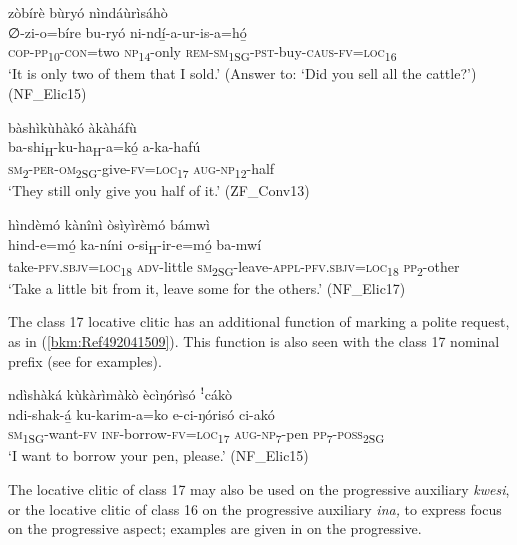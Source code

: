 \ea
\label{bkm:Ref494450771}
zòbírè bùryó nìndáùrìsáhò\\
\gll ∅-zi-o=bíre    bu-ryó  ni-ndí̲-a-ur-is-a=hó̲\\
\textsc{cop}-\textsc{pp}\textsubscript{10}-\textsc{con}=two  \textsc{np}\textsubscript{14}-only  \textsc{rem}-\textsc{sm}\textsubscript{1SG}-\textsc{pst}-buy-\textsc{caus}-\textsc{fv}=\textsc{loc}\textsubscript{16}\\
\glt ‘It is only two of them that I sold.’ (Answer to: ‘Did you sell all the cattle?’) (NF\_Elic15)
\z

\ea
\label{bkm:Ref494450803}
bàshìkùhàkó àkàháfù\\
\gll ba-shi\textsubscript{H}-ku-ha\textsubscript{H}-a=kó̲    a-ka-hafú\\
\textsc{sm}\textsubscript{2}-\textsc{per}-\textsc{om}\textsubscript{2SG}-give-\textsc{fv}=\textsc{loc}\textsubscript{17}  \textsc{aug}-\textsc{np}\textsubscript{12}-half\\
\glt ‘They still only give you half of it.’ (ZF\_Conv13)
\z

\ea
\label{bkm:Ref494450773}
\glll hìndèmó kànînì òsìyìrèmó bámwì\\
hind-e=mó̲      ka-níni   o-si\textsubscript{H}-ir-e=mó̲        ba-mwí\\
take-\textsc{pfv}.\textsc{sbjv}=\textsc{loc}\textsubscript{18}  \textsc{adv}-little
 \textsc{sm}\textsubscript{2SG}-leave-\textsc{appl}-\textsc{pfv}.\textsc{sbjv}=\textsc{loc}\textsubscript{18} \textsc{pp}\textsubscript{2}-other\\
\glt ‘Take a little bit from it, leave some for the others.’ (NF\_Elic17)
\z

The class 17 locative clitic has an additional function of marking a polite request, as in (\ref{bkm:Ref492041509}). This function is also seen with the class 17 nominal prefix (see  for examples).

\ea
\label{bkm:Ref492041509}
ndìshàká kùkàrìmàkò ècìŋórìsó ꜝcákò\\
\gll ndi-shak-á̲    ku-karim-a=ko    e-ci-ŋórisó    ci-akó\\
\textsc{sm}\textsubscript{1SG}-want-\textsc{fv}  \textsc{inf}-borrow-\textsc{fv}=\textsc{loc}\textsubscript{17}  \textsc{aug}-\textsc{np}\textsubscript{7}-pen  \textsc{pp}\textsubscript{7}-\textsc{poss}\textsubscript{2SG}\\
\glt ‘I want to borrow your pen, please.’ (NF\_Elic15)
\z

The locative clitic of class 17 may also be used on the progressive auxiliary \textit{kwesi}, or the locative clitic of class 16 on the progressive auxiliary \textit{ina,} to express focus on the progressive aspect; examples are given in  on the progressive.


